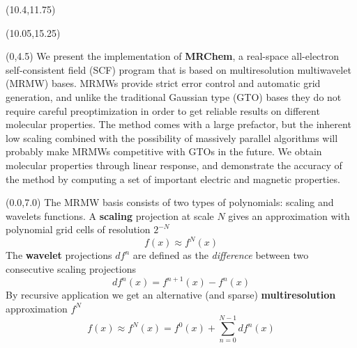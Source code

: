 \documentclass[a0,draft,portrait]{a0poster}
\def\Subhead#1{\noindent{\large\color{DarkBlue} #1}}
\begin{document}
\begin{textblock}{5}(10.4,11.75)
\Subhead{LDA}
\end{textblock}

\begin{textblock}{5}(10.05,15.25)
\Subhead{Hartree-Fock}
\end{textblock}


\begin{textblock}{9.3}(0,4.5)
We present the implementation of \textbf{MRChem}, a real-space all-electron 
self-consistent field (SCF) program that is based on multiresolution 
multiwavelet (MRMW) bases. MRMWs provide strict error control and automatic grid
generation, and unlike the traditional Gaussian type (GTO) bases they do not 
require careful preoptimization in order to get reliable 
results on different molecular properties. The method comes with a large 
prefactor, but the inherent low scaling combined with the possibility of 
massively parallel algorithms will probably make MRMWs competitive with GTOs in 
the future. We obtain molecular properties through linear response, and 
demonstrate the accuracy of the method by computing a set of
important electric and magnetic properties.
\end{textblock}

\begin{textblock}{4.3}(0.0,7.0)
The MRMW basis consists of two types of polynomials: scaling and
wavelets functions. A \textbf{scaling} projection at scale $N$ gives an 
approximation with polynomial grid cells of resolution $2^{-N}$
\begin{equation}
	f(x) \approx f^N(x) 
\end{equation}
The \textbf{wavelet} projections $df^n$ are defined as the \emph{difference} 
between two consecutive scaling projections
\begin{equation}
	\label{eq:wavelet}
	df^n(x) = f^{n+1}(x) - f^n(x)
\end{equation}
By recursive application we get an alternative (and sparse)
\textbf{multiresolution} approximation $f^N$
\begin{equation}
	\label{eq:multires}
	f(x) \approx f^N(x) = f^{0}(x) + \sum_{n=0}^{N-1} df^n(x)
\end{equation}
\end{textblock}
\end{document}

